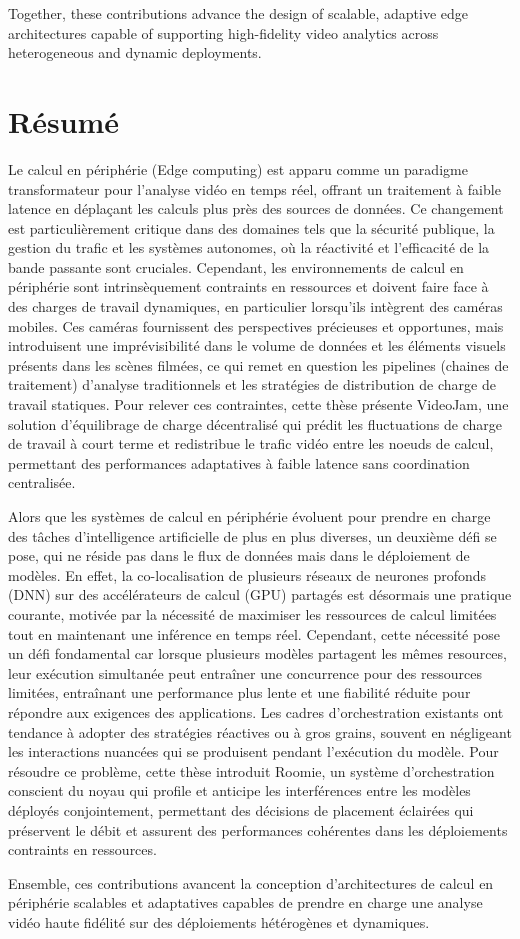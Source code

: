 Together, these contributions advance the design of scalable, adaptive edge architectures capable of supporting high-fidelity video analytics across heterogeneous and dynamic deployments.

\chapter{Résumé}

Le calcul en périphérie (Edge computing) est apparu comme un paradigme transformateur pour l'analyse vidéo en temps réel, offrant un traitement à faible latence en déplaçant les calculs plus près des sources de données. Ce changement est particulièrement critique dans des domaines tels que la sécurité publique, la gestion du trafic et les systèmes autonomes, où la réactivité et l'efficacité de la bande passante sont cruciales. Cependant, les environnements de calcul en périphérie sont intrinsèquement contraints en ressources et doivent faire face à des charges de travail dynamiques, en particulier lorsqu'ils intègrent des caméras mobiles. Ces caméras fournissent des perspectives précieuses et opportunes, mais  introduisent une imprévisibilité dans le volume de données et les éléments visuels présents dans les scènes filmées, ce qui remet en question les pipelines (chaines de traitement) d'analyse traditionnels et les stratégies de distribution de charge de travail statiques. Pour relever ces contraintes, cette thèse présente VideoJam, une solution d'équilibrage de charge décentralisé qui prédit les fluctuations de charge de travail à court terme et redistribue le trafic vidéo entre les noeuds de calcul, permettant des performances adaptatives à faible latence sans coordination centralisée.

Alors que les systèmes de calcul en périphérie évoluent pour prendre en charge des tâches d'intelligence artificielle de plus en plus diverses, un deuxième défi se pose, qui ne réside pas dans le flux de données mais dans le déploiement de modèles. En effet, la co-localisation de plusieurs réseaux de neurones profonds (DNN) sur des accélérateurs de calcul (GPU) partagés est désormais une pratique courante, motivée par la nécessité de maximiser les ressources de calcul limitées tout en maintenant une inférence en temps réel. Cependant, cette nécessité pose un défi fondamental car lorsque plusieurs modèles partagent les mêmes resources, leur exécution simultanée peut entraîner une concurrence pour des ressources limitées, entraînant une performance plus lente et une fiabilité réduite pour répondre aux exigences des applications. Les cadres d'orchestration existants ont tendance à adopter des stratégies réactives ou à gros grains, souvent en négligeant les interactions nuancées qui se produisent pendant l'exécution du modèle. Pour résoudre ce problème, cette thèse introduit Roomie, un système d'orchestration conscient du noyau qui profile et anticipe les interférences entre les modèles déployés conjointement, permettant des décisions de placement éclairées qui préservent le débit et assurent des performances cohérentes dans les déploiements contraints en ressources.

Ensemble, ces contributions avancent la conception d'architectures de calcul en périphérie scalables et adaptatives capables de prendre en charge une analyse vidéo haute fidélité sur des déploiements hétérogènes et dynamiques.